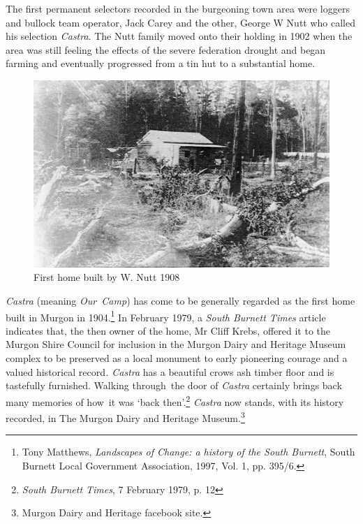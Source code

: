 The first permanent selectors recorded in the burgeoning town area were loggers and bullock team operator, Jack Carey and the other, George W Nutt who called his selection \emph{Castra}. The Nutt family moved onto their holding in 1902 when the area was still feeling the effects of the severe federation drought and began farming and eventually progressed from a tin hut to a substantial home.









\begin{figure}
\begin{center}
\includegraphics[width=1.\linewidth,center]{../images/HouseWNutt1908.jpg}
\caption{First home built by W. Nutt 1908}
\end{center}
\end{figure}




\emph{Castra} (meaning \emph{Our~Camp}) has come to be generally regarded as the first home built in Murgon in 1904.\footnote{Tony Matthews, \emph{Landscapes of Change: a history of the South Burnett}, South Burnett Local Government Association, 1997, Vol. 1, pp. 395/6.} In February 1979, a \emph{South Burnett Times} article indicates that, the then owner of the home, Mr Cliff Krebs, offered it to the Murgon Shire Council for inclusion in the Murgon Dairy and Heritage Museum complex to be preserved as a local monument to early pioneering courage and a valued historical record\emph{. Castra} has a beautiful crows ash timber floor and is tastefully furnished. Walking through~the door of \emph{Castra} certainly brings back many memories of how~it was `back then'.\footnote{\emph{South Burnett Times}, 7 February 1979, p. 12} \emph{Castra} now stands, with its history recorded, in The Murgon Dairy and Heritage Museum.\footnote{Murgon Dairy and Heritage facebook site.}








